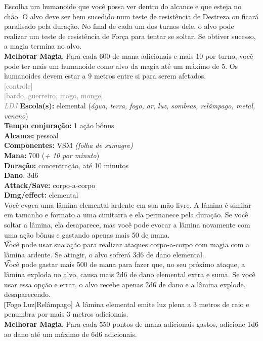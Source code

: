 \documentclass{RPG_Adventure}[2021/10/20]
\begin{document}
{\normalsize Escolha um humanoide que você possa ver dentro do alcance e que esteja no chão. O alvo deve ser bem sucedido num teste de resistência de Destreza ou ficará paralisado pela duração. No final de cada um dos turnos dele, o alvo pode realizar um teste de resistência de Força para tentar se soltar. Se obtiver sucesso, a magia termina no alvo.\\\t \textbf{Melhorar Magia}. Para cada 600 de mana adicionais e mais 10 por turno, você pode ter mais um humanoide como alvo da magia até um máximo de 5. Os humanoides devem estar a 9 metros entre si para serem afetados.\\}
{\scriptsize \textcolor{gray}{[controle]\\}}
{\scriptsize \textcolor{gray}{[bardo, guerreiro, mago, monge]\\}}
{\tiny \textcolor{gray}{\textit{LDJ}}}\jump{}
{\small \t \textbf{Escola(s):} elemental (\textit{água, terra, fogo, ar, luz, sombras, relâmpago, metal, veneno})\\\t \textbf{Tempo conjuração:} 1 ação bônus\\\t \textbf{Alcance:} pessoal\\\t \textbf{Componentes:} VSM \textit{(folha de sumagre)}\\\t \textbf{Mana:} 700 (\textit{+ 10 por minuto})\\\t \textbf{Duração:} concentração, até 10 minutos\\\t \textbf{Dano}: 3d6\\\t \textbf{Attack/Save:} corpo-a-corpo\\\t \textbf{Dmg/effect:} elemental\\}
{\normalsize Você evoca uma lâmina elemental ardente em sua mão livre. A lâmina é similar em tamanho e formato a uma cimitarra e ela permanece pela duração. Se você soltar a lâmina, ela desaparece, mas você pode evocar a lâmina novamente com uma ação bônus e gastando apenas mais 50 de mana.\\\t Você pode usar sua ação para realizar ataques corpo-a-corpo com magia com a lâmina ardente. Se atingir, o alvo sofrerá 3d6 de dano elemental.\\\t Você pode gastar mais 500 de mana para fazer que, no seu próximo ataque, a lâmina exploda no alvo, causa mais 2d6 de dano elemental extra e suma. Se você usar essa opção e errar, o alvo recebe apenas 2d6 de dano e a lâmina explode, desaparecendo.\\\t [Fogo|Luz|Relâmpago] A lâmina elemental emite luz plena a 3 metros de raio e penumbra por mais 3 metros adicionais.\\\t \textbf{Melhorar Magia}. Para cada 550 pontos de mana adicionais gastos, adicione 1d6 ao dano até um máximo de 6d6 adicionais.\\}
\end{document}
